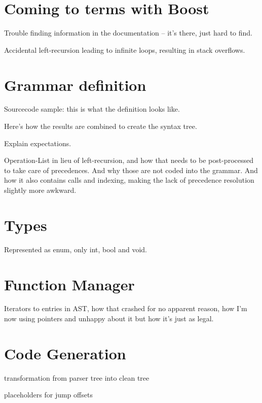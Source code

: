     
    \section{Coming to terms with Boost}
    
        Trouble finding information in the documentation -- it's there, just hard to find.
        
        Accidental left-recursion leading to infinite loops, resulting in stack overflows.
    
    \section{Grammar definition}
    
        Sourcecode sample: this is what the definition looks like.
        
        Here's how the results are combined to create the syntax tree.
        
        Explain expectations.
        
        Operation-List in lieu of left-recursion, and how that needs to be post-processed to take care of precedences. And why those are not coded into the grammar. And how it also contains calls and indexing, making the lack of precedence resolution slightly more awkward.
    
    \section{Types}
        
        Represented as enum, only int, bool and void.
    
    \section{Function Manager}
    
        Iterators to entries in AST, how that crashed for no apparent reason, how I'm now using pointers and unhappy about it but how it's just as legal.
    
    \section{Code Generation}
    
        transformation from parser tree into clean tree
    
        placeholders for jump offsets
        
